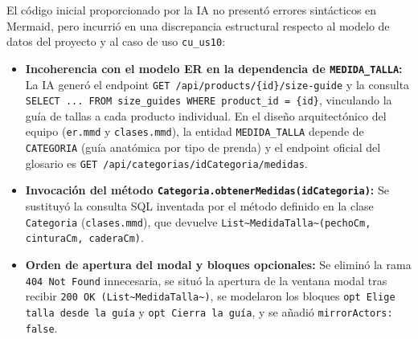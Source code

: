 El código inicial proporcionado por la IA no presentó errores sintácticos en Mermaid, pero incurrió en una discrepancia estructural respecto al modelo de datos del proyecto y al caso de uso \texttt{cu\_us10}:
\begin{itemize}[leftmargin=*,nosep]
\item \textbf{Incoherencia con el modelo ER en la dependencia de \texttt{MEDIDA\_TALLA}:} La IA generó el endpoint \texttt{GET /api/products/\{id\}/size-guide} y la consulta \texttt{SELECT ... FROM size\_guides WHERE product\_id = \{id\}}, vinculando la guía de tallas a cada producto individual. En el diseño arquitectónico del equipo (\texttt{er.mmd} y \texttt{clases.mmd}), la entidad \texttt{MEDIDA\_TALLA} depende de \texttt{CATEGORIA} (guía anatómica por tipo de prenda) y el endpoint oficial del glosario es \texttt{GET /api/categorias/idCategoria/medidas}.
\item \textbf{Invocación del método \texttt{Categoria.obtenerMedidas(idCategoria)}:} Se sustituyó la consulta SQL inventada por el método definido en la clase \texttt{Categoria} (\texttt{clases.mmd}), que devuelve \texttt{List\textasciitilde MedidaTalla\textasciitilde (pechoCm, cinturaCm, caderaCm)}.
\item \textbf{Orden de apertura del modal y bloques opcionales:} Se eliminó la rama \texttt{404 Not Found} innecesaria, se situó la apertura de la ventana modal tras recibir \texttt{200 OK (List\textasciitilde MedidaTalla\textasciitilde)}, se modelaron los bloques \texttt{opt Elige talla desde la guía} y \texttt{opt Cierra la guía}, y se añadió \texttt{mirrorActors: false}.
\end{itemize}
